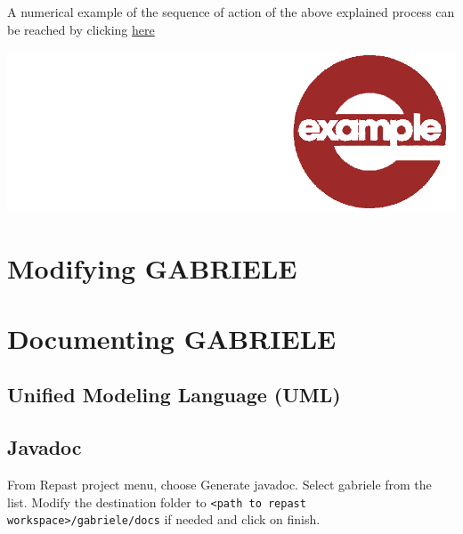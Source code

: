 \documentclass{book}
\newcommand{\umllocation}{file:///Users/giulioni/Dropbox/svn/sfcabm_my/documentation}
\begin{document}
\vskip1cm
A numerical example of the sequence of action of the above explained process can be reached by clicking \href{\umllocation/example_firm_good_conditions.html}{here}
\begin{marginfigure}
\hskip8mm	\includegraphics[scale=0.07]{example.png}
\end{marginfigure}



\part{Modifying GABRIELE}

\part{Documenting GABRIELE}
\chapter{Unified Modeling Language (UML)}


\chapter{Javadoc}

From Repast project menu, choose Generate javadoc. Select gabriele from the list. Modify the destination folder to 
\verb+<path to repast workspace>/gabriele/docs+ if needed and click on finish.
\end{document}
